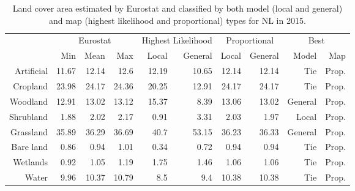 \begin{table}[H]
\centering
\caption{Land cover area estimated by Eurostat and classified by both model (local and general) and map (highest likelihood and proportional) types for NL in 2015.}

\begin{tabular}{r|rrr|rr|rr|rr}
\toprule
{} & \multicolumn{3}{|c}{Eurostat} & \multicolumn{2}{|c}{Highest Likelihood} & \multicolumn{2}{|c}{Proportional} & \multicolumn{2}{|c}{Best} \\
{} &      Min &   Mean &    Max &              Local & General &        Local & General &    Model &    Map \\
\midrule
Artificial &    11.67 &  12.14 &   12.6 &              12.19 &   10.65 &        12.14 &   12.14 &      Tie &  Prop. \\
Cropland   &    23.98 &  24.17 &  24.36 &              20.25 &   12.91 &        24.17 &   24.17 &      Tie &  Prop. \\
Woodland   &    12.91 &  13.02 &  13.12 &              15.37 &    8.39 &        13.06 &   13.02 &  General &  Prop. \\
Shrubland  &     1.88 &   2.02 &   2.17 &               0.91 &    3.31 &         2.03 &    1.97 &    Local &  Prop. \\
Grassland  &    35.89 &  36.29 &  36.69 &               40.7 &   53.15 &        36.23 &   36.33 &  General &  Prop. \\
Bare land  &     0.86 &   0.94 &   1.01 &               0.34 &    0.72 &         0.94 &    0.94 &      Tie &  Prop. \\
Wetlands   &     0.92 &   1.05 &   1.19 &               1.75 &    1.46 &         1.06 &    1.06 &      Tie &  Prop. \\
Water      &     9.96 &  10.37 &  10.79 &                8.5 &     9.4 &        10.38 &   10.38 &      Tie &  Prop. \\
\bottomrule
\end{tabular}
\end{table}

